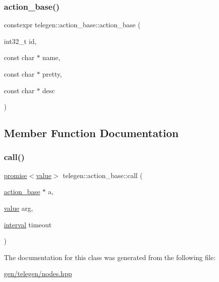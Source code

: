 \subsubsection{\texorpdfstring{action\+\_\+base()}{action\_base()}}
{\footnotesize\ttfamily constexpr telegen\+::action\+\_\+base\+::action\+\_\+base (\begin{DoxyParamCaption}\item[{int32\+\_\+t}]{id,  }\item[{const char $\ast$}]{name,  }\item[{const char $\ast$}]{pretty,  }\item[{const char $\ast$}]{desc }\end{DoxyParamCaption})\hspace{0.3cm}{\ttfamily [inline]}}



\subsection{Member Function Documentation}
\mbox{\label{classtelegen_1_1action__base_aa05f686e2a085c773bcbc8ac07da6f04}} 
\subsubsection{\texorpdfstring{call()}{call()}}
{\footnotesize\ttfamily \hyperlink{namespacetelegen_a9dd802bb5d30cf96b0c616750d43ae86}{promise}$<$\hyperlink{classtelegen_1_1value}{value}$>$ telegen\+::action\+\_\+base\+::call (\begin{DoxyParamCaption}\item[{\hyperlink{classtelegen_1_1action__base}{action\+\_\+base} $\ast$}]{a,  }\item[{\hyperlink{classtelegen_1_1value}{value}}]{arg,  }\item[{\hyperlink{namespacetelegen_ad925de2d0a99bc43918533abf0457344}{interval}}]{timeout }\end{DoxyParamCaption})\hspace{0.3cm}{\ttfamily [inline]}}



The documentation for this class was generated from the following file\+:\begin{DoxyCompactItemize}
\item 
\hyperlink{gen_2telegen_2nodes_8hpp}{gen/telegen/nodes.\+hpp}\end{DoxyCompactItemize}
